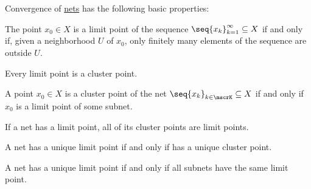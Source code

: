 \begin{proposition}\label{thm:def:net_convergence}
  Convergence of \hyperref[def:net_convergence]{nets} has the following basic properties:

  \begin{thmenum}
     The point \( x_0 \in X \) is a limit point of the sequence \( \seq{ x_k }_{k=1}^\infty \subseteq X \) if and only if, given a neighborhood \( U \) of \( x_0 \), only finitely many elements of the sequence are outside \( U \).

     Every limit point is a cluster point.

     A point \( x_0 \in X \) is a cluster point of the net \( \seq{ x_k }_{k \in \mscrK} \subseteq X \) if and only if \( x_0 \) is a limit point of some subnet.

     If a net has a limit point, all of its cluster points are limit points.

     A net has a unique limit point if and only if has a unique cluster point.

     A net has a unique limit point if and only if all subnets have the same limit point.
  \end{thmenum}
\end{proposition}
